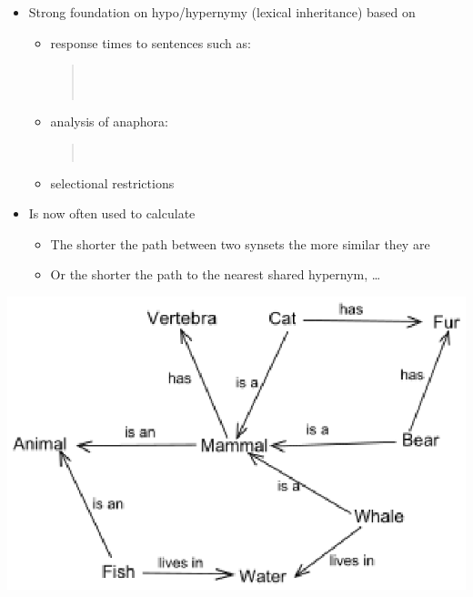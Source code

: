 \documentclass[a4paper,landscape,headrule,footrule,xetex]{foils}
\begin{document}
\begin{itemize}
\item Strong foundation on hypo/hypernymy (lexical inheritance) based on
  \begin{itemize}
  \item   response times to sentences such as:
    \begin{quote}%
      \\
      \\
    \end{quote}
  \item analysis of anaphora:
    \begin{quote}%
      \\
    \end{quote}
  \item selectional restrictions
  \end{itemize}
\item Is now often used to calculate 
  \begin{itemize}
  \item The shorter the path between two synsets the more similar they are
  \item Or the shorter the path to the nearest shared hypernym, \ldots
  \end{itemize}
\end{itemize}


\MyLogo{}
\bigskip
\bigskip
\bigskip
\includegraphics[height=0.75\textheight]{pics/Semantic_Net.eps}
\end{document}
